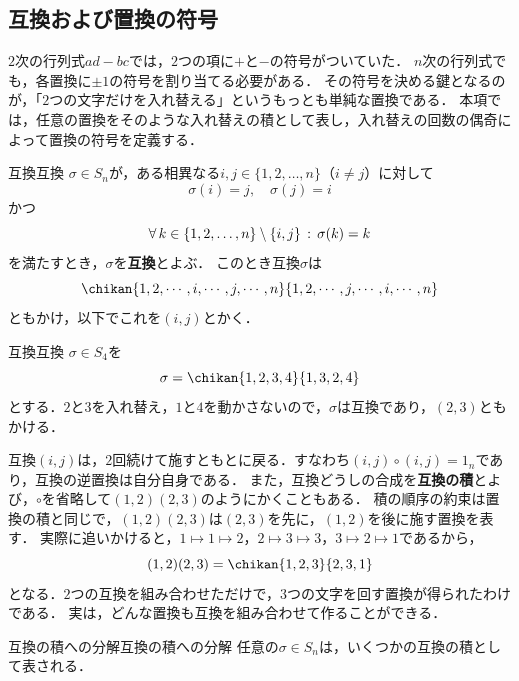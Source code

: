 \subsection{互換および置換の符号}

$2$次の行列式$ad - bc$では，$2$つの項に$+$と$-$の符号がついていた．
$n$次の行列式でも，各置換に$\pm 1$の符号を割り当てる必要がある．
その符号を決める鍵となるのが，「$2$つの文字だけを入れ替える」というもっとも単純な置換である．
本項では，任意の置換をそのような入れ替えの積として表し，入れ替えの回数の偶奇によって置換の符号を定義する．


\begin{definition}{互換}{互換}
  $\sigma \in S_n$が，ある相異なる$i, j \in \{1, 2, \dots, n\}$（$i \ne j$）に対して
  \[
  \sigma(i) = j, \quad \sigma(j) = i
  \]
  かつ
  \[
  \forall\, k \in \{1, 2, \dots, n\} \setminus \{i, j\} \,:\, \sigma(k) = k
  \]
  を満たすとき，$\sigma$を\textbf{互換}とよぶ． このとき互換$\sigma$は
  \[
  \chikan{1, 2, \cdots, i, \cdots, j, \cdots, n}{1, 2, \cdots, j, \cdots, i, \cdots, n}
  \]
  ともかけ，以下でこれを$(i,j)$とかく．
\end{definition}

\begin{example}{互換}{互換}
  $\sigma \in S_4$を
  \[
  \sigma = \chikan{1, 2, 3, 4}{1, 3, 2, 4}
  \]
  とする．$2$と$3$を入れ替え，$1$と$4$を動かさないので，$\sigma$は互換であり，$(2,3)$ともかける．
\end{example}

互換$(i, j)$は，$2$回続けて施すともとに戻る．すなわち$(i, j) \circ (i, j) = 1_n$であり，互換の逆置換は自分自身である．
また，互換どうしの合成を\textbf{互換の積}とよび，$\circ$を省略して$(1,2)(2,3)$のようにかくこともある．
積の順序の約束は置換の積と同じで，$(1,2)(2,3)$は$(2,3)$を先に，$(1,2)$を後に施す置換を表す．
実際に追いかけると，$1 \mapsto 1 \mapsto 2$，$2 \mapsto 3 \mapsto 3$，$3 \mapsto 2 \mapsto 1$であるから，
\[
  (1,2)(2,3) = \chikan{1, 2, 3}{2, 3, 1}
\]
となる．$2$つの互換を組み合わせただけで，$3$つの文字を回す置換が得られたわけである．
実は，どんな置換も互換を組み合わせて作ることができる．

\begin{prop}{互換の積への分解}{互換の積への分解}
  任意の$\sigma \in S_n$は，いくつかの互換の積として表される．
\end{prop}


